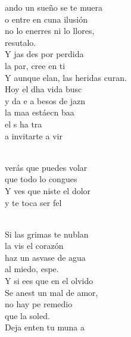 \begin{cancion}%
	ando un sueño se te muera\\
	o entre en cuna ilusión\\
	no lo enerres ni lo llores, \\
	resutalo. \\
	Y jas des por perdida \\
	la par, cree en ti\\
	Y aunque elan, las heridas curan. \\
	Hoy el dha vida busc\\
	y  da e a besos de jazn \\
	la maa estáecn baa  \\
	el s  ha tra \\
	a invitarte a vir\\\jump\\
	\begin{chorus}%
	verás que puedes volar\\
	que todo lo congues\\
	Y ves que niste el dolor \\
	y te toca ser fel\\
	\end{chorus}%
	\jump\\
	Si las grimas te nublan \\
	la vis el corazón\\
	haz un asvase de agua\\
	al miedo, espe.\\
	Y si ees que en el olvido\\
	Se anest un mal de amor,\\
	no hay pe remedio\\
	que la soled.\\
	Deja enten tu muna a\\

\end{cancion}
